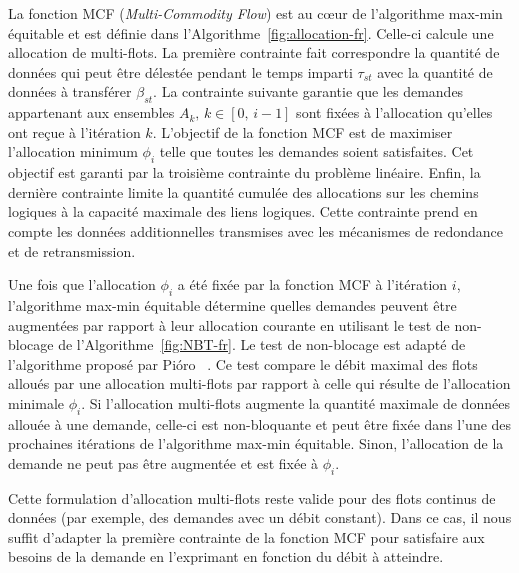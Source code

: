  
La fonction \textsf{MCF} (\textit{Multi-Commodity Flow}) est au cœur de l’algorithme max-min équitable et est définie dans l’Algorithme~\ref{fig:allocation-fr}. Celle-ci calcule une allocation de multi-flots. La première contrainte fait correspondre la quantité de données qui peut être délestée pendant le temps imparti $\tau_{st}$ avec la quantité de données à transférer $\beta_{st}$. La contrainte suivante garantie que les demandes appartenant aux ensembles $A_{k},\,k\in [0,\,i-1]$ sont fixées à l’allocation qu’elles ont reçue à l’itération $k$. L’objectif de la fonction \textsf{MCF} est de maximiser l’allocation minimum $\phi_{i}$ telle que toutes les demandes soient satisfaites. Cet objectif est garanti par la troisième contrainte du problème linéaire. Enfin, la dernière contrainte limite la quantité cumulée des allocations sur les chemins logiques à la capacité maximale des liens logiques. Cette contrainte prend en compte les données additionnelles transmises avec les mécanismes de redondance et de retransmission. 
 
 
Une fois que l’allocation $\phi_i$ a été fixée par la fonction \textsf{MCF} à l’itération $i$, l’algorithme max-min équitable détermine quelles demandes peuvent être augmentées par rapport à leur allocation courante en utilisant le test de non-blocage de l’Algorithme~\ref{fig:NBT-fr}. Le test de non-blocage est adapté de l’algorithme proposé par Pi\'{o}ro \etal~\cite{pioro2003efficient}. Ce test compare le débit maximal des flots alloués par une allocation multi-flots par rapport à celle qui résulte de l’allocation minimale $\phi_{i}$. Si l’allocation multi-flots augmente la quantité maximale de données allouée à une demande, celle-ci est non-bloquante et peut être fixée dans l’une des prochaines itérations de l’algorithme max-min équitable. Sinon, l’allocation de la demande ne peut pas être augmentée et est fixée à $\phi_{i}$. 
 
 
Cette formulation d’allocation multi-flots reste valide pour des flots continus de données (par exemple, des demandes avec un débit constant). Dans ce cas, il nous suffit d’adapter la première contrainte de la fonction \textsf{MCF} pour satisfaire aux besoins de la demande en l’exprimant en fonction du débit à atteindre. 

 
